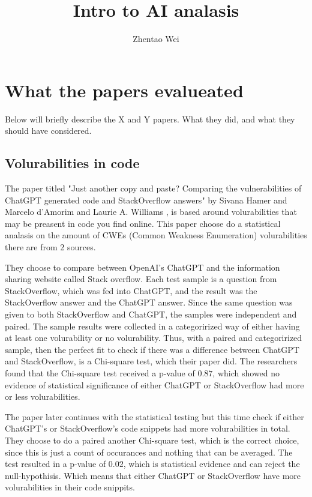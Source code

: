 \documentclass[12pt]{article}
\begin{document}
\title{Intro to AI analasis}
\author{Zhentao Wei}
\maketitle
\newpage
\thispagestyle{empty}
\newpage

\tableofcontents
\newpage

\section{What the papers evalueated}
Below will briefly describe the X and Y papers.
What they did, and what they should have considered.
\subsection{Volurabilities in code}
The paper titled "Just another copy and paste? Comparing the vulnerabilities of ChatGPT generated code and StackOverflow answers" by Sivana Hamer and Marcelo d'Amorim and Laurie A. Williams \cite{Hamer2024},
is based around volurabilities that may be preasent in code you find online.
This paper choose do a statistical analasis on the amount of CWEs (Common Weakness Enumeration) volurabilities there are from 2 sources.

They choose to compare between OpenAI's ChatGPT and the information sharing website called Stack overflow.
Each test sample is a question from StackOverflow, which was fed into ChatGPT, and the result was the StackOverflow answer and the ChatGPT answer.
Since the same question was given to both StackOverflow and ChatGPT, the samples were independent and paired.
The sample results were collected in a categorirized way of either having at least one volurability or no volurability.
Thus, with a paired and categorirized sample, then the perfect fit to check if there was a difference between ChatGPT and StackOverflow, is a Chi-square test, which their paper did.
The researchers found that the Chi-square test received a p-value of $0.87$, which showed no evidence of statistical significance of either ChatGPT or StackOverflow had more or less volurabilities.

The paper later continues with the statistical testing but this time check if either ChatGPT's or StackOverflow's code snippets had more volurabilities in total.
They choose to do a paired another Chi-square test, which is the correct choice, since this is just a count of occurances and nothing that can be averaged.
The test resulted in a p-value of $0.02$, which is statistical evidence and can reject the null-hypothisis.
Which means that either ChatGPT or StackOverflow have more volurabilities in their code snippits.
\end{document}
